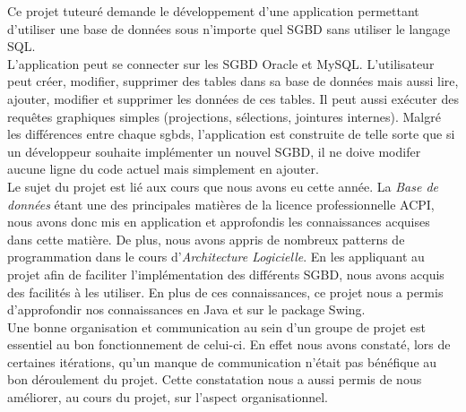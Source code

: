 Ce projet tuteuré demande le développement d’une application permettant d’utiliser une base de données sous n'importe quel SGBD sans utiliser le langage SQL.\\

L'application peut se connecter sur les SGBD Oracle et MySQL. 
L'utilisateur peut créer, modifier, supprimer des tables dans sa base de données mais aussi lire, ajouter, modifier et supprimer les données de ces tables. 
Il peut aussi exécuter des requêtes graphiques simples (projections, sélections, jointures internes). 
Malgré les différences entre chaque \glspl{sgbd}, l'application est construite de telle sorte que si un développeur souhaite implémenter un nouvel SGBD, il ne doive modifer aucune ligne du code actuel mais simplement en ajouter.\\

Le sujet du projet est lié aux cours que nous avons eu cette année. 
La \textit{Base de données} étant une des principales matières de la licence professionnelle ACPI, nous avons donc mis en application et approfondis les connaissances acquises dans cette matière. 
De plus, nous avons appris de nombreux patterns de programmation dans le cours d'\textit{Architecture Logicielle}. 
En les appliquant au projet afin de faciliter l'implémentation des différents SGBD, nous avons acquis des facilités à les utiliser. 
En plus de ces connaissances, ce projet nous a permis d'approfondir nos connaissances en Java et sur le package Swing. \\

Une bonne organisation et communication au sein d'un groupe de projet est essentiel au bon fonctionnement de celui-ci. 
En effet nous avons constaté, lors de certaines itérations, qu'un manque de communication n'était pas bénéfique au bon déroulement du projet. 
Cette constatation nous a aussi permis de nous améliorer, au cours du projet, sur l'aspect organisationnel.